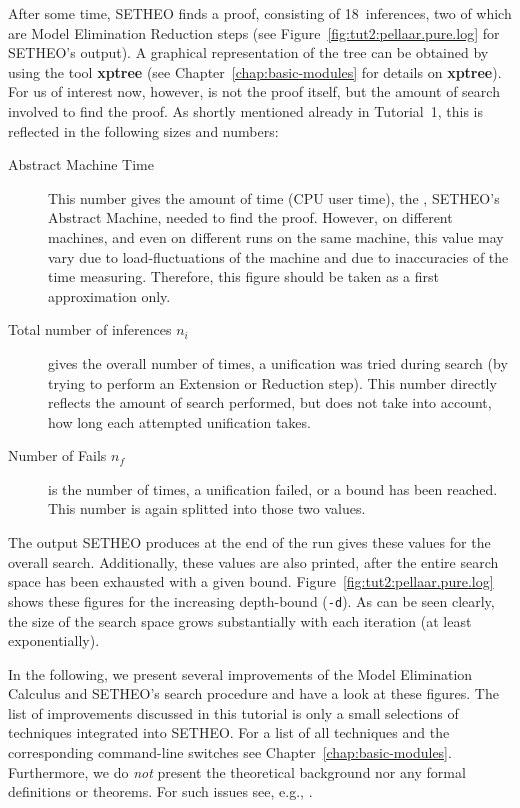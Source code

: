 After some time, SETHEO finds a proof, consisting of 18~inferences,
two of which are Model Elimination Reduction steps
(see Figure~\ref{fig:tut2:pellaar.pure.log} for SETHEO's output).
A graphical representation
of the tree can be obtained by using the tool {\bf xptree} (see
Chapter~\ref{chap:basic-modules} for details on {\bf xptree}).
For us of interest now, however, is not the proof itself, but the amount
of search involved to find the proof.
As shortly mentioned already in Tutorial~1, 
this is reflected in the following sizes and numbers:

\begin{description}
\item[Abstract Machine Time] 
This number gives the amount of time (CPU user time), the \SAM,
SETHEO's Abstract Machine, needed to find the proof.  
However, on different machines, and even on different runs on the same
machine, this value may vary due to load-fluctuations of the machine
and due to inaccuracies of the time measuring. 
Therefore, this figure should be taken as a first approximation only.

\item[Total number of inferences $n_i$] gives the overall number of times,
a unification was tried during search (by trying to perform an
Extension or Reduction step). This number directly reflects the amount
of search performed, but does not take into account, how long each
attempted unification takes.

\item[Number of Fails $n_f$] is the number of times, a unification failed,
or a bound has been reached. This number is again splitted into those
two values.
\end{description}

The output SETHEO produces at the end of the run gives these values
for the overall search. Additionally, these values are also
printed, after the entire search space has been exhausted with a given
bound. Figure~\ref{fig:tut2:pellaar.pure.log} shows these figures
for the increasing depth-bound ({\tt -d}). As can be seen clearly,
the size of the search space grows substantially with each iteration
(at least exponentially).

In the following, we present several improvements of the Model
Elimination Calculus and SETHEO's search procedure and have a look
at these figures.
The list of improvements discussed in this tutorial
is only a small selections of techniques integrated into SETHEO.
For a list of all techniques and the corresponding command-line
switches see Chapter~\ref{chap:basic-modules}.
Furthermore, we do {\em not\/} present the theoretical background
nor any formal definitions or theorems. For such issues see,
e.g., \cite{LSBB92,LMG94,Let93,Mayrdiss}.

